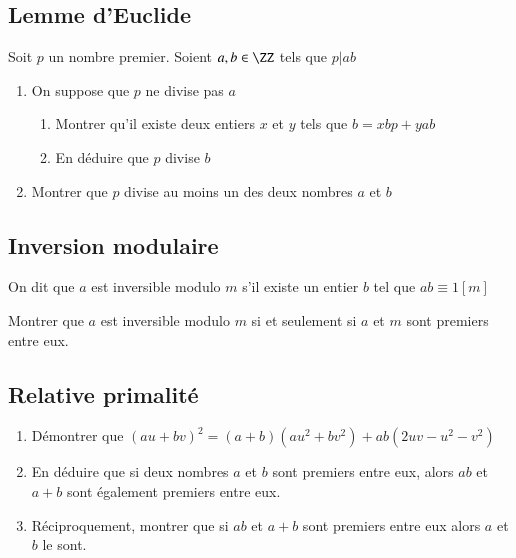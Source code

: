 \documentclass[oneside,12pt]{article}          %
\begin{document}
\subsection{Lemme d'Euclide}
Soit $p$ un nombre premier. Soient $a,b\in\ZZ$ tels que $p\vert ab$
\begin{enumerate}
	\item On suppose que $p$ ne divise pas $a$
	\begin{enumerate}
		\item Montrer qu'il existe deux entiers $x$ et $y$ tels que $b=xbp+yab$
		\item En déduire que $p$ divise $b$
	\end{enumerate}
	\item Montrer que $p$ divise au moins un des deux nombres $a$ et $b$
\end{enumerate}



\subsection{Inversion modulaire}
On dit que $a$ est inversible modulo $m$ s'il existe un entier $b$ tel que $ab\equiv1[m]$

Montrer que $a$ est inversible modulo $m$ si et seulement si $a$ et $m$ sont premiers entre eux.



\subsection{Relative primalité}
\begin{enumerate}
	\item Démontrer que $(au+bv)^2=(a+b)(au^2+bv^2)+ab(2uv-u^2-v^2)$
	\item En déduire que si deux nombres $a$ et $b$ sont premiers entre eux, alors $ab$ et $a+b$ sont également premiers entre eux.
	\item Réciproquement, montrer que si $ab$ et $a+b$ sont premiers entre eux alors $a$ et $b$ le sont.
\end{enumerate}
\end{document}
